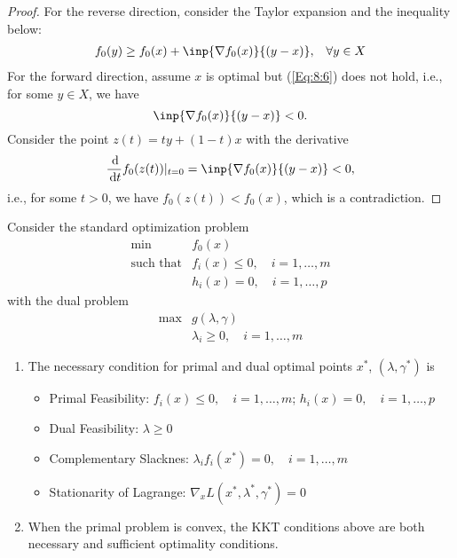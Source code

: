 \begin{proof}
For the reverse direction, consider the Taylor expansion and the inequality below:
\[
\begin{array}{ll}
f_0(y)\ge f_0(x)+\inp{\nabla f_0(x)}{(y-x)},
&
\forall y\in X
\end{array}
\]  
For the forward direction, assume $x$ is optimal but (\ref{Eq:8:6}) does not hold, i.e., for some $y\in X$, we have
\[
\inp{\nabla f_0(x)}{(y-x)}<0.
\]
Consider the point $z(t)=ty+(1-t)x$ with the derivative
\[
\frac{\diff}{\diff t}f_0(z(t))|_{t=0}=\inp{\nabla f_0(x)}{(y-x)}<0,
\]
i.e., for some $t>0$, we have $f_0(z(t))<f_0(x)$, which is a contradiction.
\end{proof}
\begin{proposition}
Consider the standard optimization problem
\begin{equation}
\begin{array}{ll}
\min&f_0(x)\\
\mbox{such that}&f_i(x)\le0,\quad i=1,\dots,m\\
&h_i(x)=0,\quad i=1,\dots,p
\end{array}
\end{equation}
with the dual problem
\begin{equation}
\begin{array}{ll}
\max&g(\lambda,\gamma)\\
&\lambda_i\ge0,\quad i=1,\dots,m
\end{array}
\end{equation}
\begin{enumerate}
\item
The necessary condition for primal and dual optimal points $x^*$, $(\lambda,\gamma^*)$ is
\begin{itemize}
\item
Primal Feasibility: $f_i(x)\le0,\quad i=1,\dots,m$; $h_i(x)=0,\quad i=1,\dots,p$
\item
Dual Feasibility: $\lambda\ge0$
\item
Complementary Slacknes: $\lambda_if_i(x^*)=0,\quad i=1,\dots,m$
\item
Stationarity of Lagrange: $\nabla_xL(x^*,\lambda^*,\gamma^*)=0$
\end{itemize}
\item
When the primal problem is convex, the KKT conditions above are both necessary and sufficient optimality conditions.
\end{enumerate}
\end{proposition}
